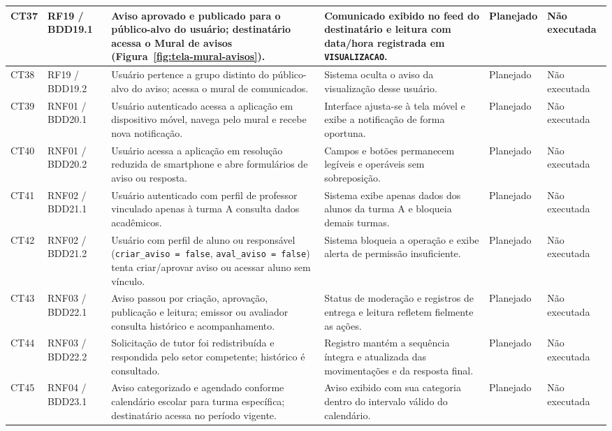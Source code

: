 \documentclass[a4paper,12pt]{report}
\begin{document}
\begin{longtable}{|p{1.2cm}|p{2.0cm}|p{3.8cm}|p{4.0cm}|p{1.6cm}|p{2.0cm}|}
\hline
CT37 & RF19 / BDD19.1 & Aviso aprovado e publicado para o público-alvo do usuário; destinatário acessa o Mural de avisos (Figura~\ref{fig:tela-mural-avisos}). & Comunicado exibido no feed do destinatário e leitura com data/hora registrada em \texttt{VISUALIZACAO}. & Planejado & Não executada \\
\hline
CT38 & RF19 / BDD19.2 & Usuário pertence a grupo distinto do público-alvo do aviso; acessa o mural de comunicados. & Sistema oculta o aviso da visualização desse usuário. & Planejado & Não executada \\
\hline
CT39 & RNF01 / BDD20.1 & Usuário autenticado acessa a aplicação em dispositivo móvel, navega pelo mural e recebe nova notificação. & Interface ajusta-se à tela móvel e exibe a notificação de forma oportuna. & Planejado & Não executada \\
\hline
CT40 & RNF01 / BDD20.2 & Usuário acessa a aplicação em resolução reduzida de smartphone e abre formulários de aviso ou resposta. & Campos e botões permanecem legíveis e operáveis sem sobreposição. & Planejado & Não executada \\
\hline
CT41 & RNF02 / BDD21.1 & Usuário autenticado com perfil de professor vinculado apenas à turma A consulta dados acadêmicos. & Sistema exibe apenas dados dos alunos da turma A e bloqueia demais turmas. & Planejado & Não executada \\
\hline
CT42 & RNF02 / BDD21.2 & Usuário com perfil de aluno ou responsável (\texttt{criar\_aviso = false}, \texttt{aval\_aviso = false}) tenta criar/aprovar aviso ou acessar aluno sem vínculo. & Sistema bloqueia a operação e exibe alerta de permissão insuficiente. & Planejado & Não executada \\
\hline
CT43 & RNF03 / BDD22.1 & Aviso passou por criação, aprovação, publicação e leitura; emissor ou avaliador consulta histórico e acompanhamento. & Status de moderação e registros de entrega e leitura refletem fielmente as ações. & Planejado & Não executada \\
\hline
CT44 & RNF03 / BDD22.2 & Solicitação de tutor foi redistribuída e respondida pelo setor competente; histórico é consultado. & Registro mantém a sequência íntegra e atualizada das movimentações e da resposta final. & Planejado & Não executada \\
\hline
CT45 & RNF04 / BDD23.1 & Aviso categorizado e agendado conforme calendário escolar para turma específica; destinatário acessa no período vigente. & Aviso exibido com sua categoria dentro do intervalo válido do calendário. & Planejado & Não executada \\

\end{longtable}
\end{document}
